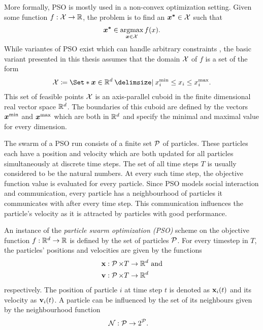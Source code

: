 More formally, PSO is mostly used in a non-convex optimization setting.
Given some function $f : \operatorname{\mathcal{X}} \to \mathbb{R}$, the problem is to find an $\bm{x^\ast} \in \operatorname{\mathcal{X}}$ such that
\begin{align}
    \bm{x^\ast} \in \operatorname*{argmax}_{\bm{x} \in \operatorname{\mathcal{X}}} f(x).
\end{align}
While variantes of PSO exist which can handle arbitrary constraints \cite{engelbrecht_fundamentals_2006}, the basic variant presented in this thesis assumes that the domain $\operatorname{\mathcal{X}}$ of $f$ is a set of the form
\begin{align}
    \X \coloneqq \Set*{\mat{x} \in \R^d \with x^{\text{min}}_i \leq x_i \leq x^{\text{max}}_i}.
\end{align}
This set of feasible points $\operatorname{\mathcal{X}}$ is an axis-parallel cuboid in the finite dimensional real vector space $\mathbb{R}^d$.
The boundaries of this cuboid are defined by the vectors $\bm{x^{\text{min}}}$ and $\bm{x^{\text{max}}}$ which are both in $\mathbb{R}^d$ and specify the minimal and maximal value for every dimension.

The swarm of a PSO run consists of a finite set $\operatorname{\mathcal{P}}$ of particles.
These particles each have a position and velocity which are both updated for all particles simultaneously at discrete time steps.
The set of all time steps $T$ is usually considered to be the natural numbers.
At every such time step, the objective function value is evaluated for every particle.
Since PSO models social interaction and communication, every particle has a neighbourhood of particles it communicates with after every time step.
This communication influences the particle's velocity as it is attracted by particles with good performance.
\begin{definition}
    An instance of the \emph{particle swarm optimization (PSO)} scheme on the objective function $f : \mathbb{R}^d \to \mathbb{R}$ is defined by the set of particles $\operatorname{\mathcal{P}}$.
    For every timestep in $T$, the particles' positions and velocities are given by the functions
    \begin{align}
        \operatorname{\mathbf{x}} &: \operatorname{\mathcal{P}} \times T \to \mathbb{R}^d \text{ and} \\
        \operatorname{\mathbf{v}} &: \operatorname{\mathcal{P}} \times T \to \mathbb{R}^d
    \end{align}
    respectively. The position of particle $i$ at time step $t$ is denoted as $\operatorname{\mathbf{x}}_i(t)$ and its velocity as $\operatorname{\mathbf{v}}_i(t)$. A particle can be influenced by the set of its neighbours given by the neighbourhood function
    \begin{align}
        \operatorname{\mathcal{N}} &: \operatorname{\mathcal{P}} \to 2^{\operatorname{\mathcal{P}}}.
    \end{align}
\end{definition}


